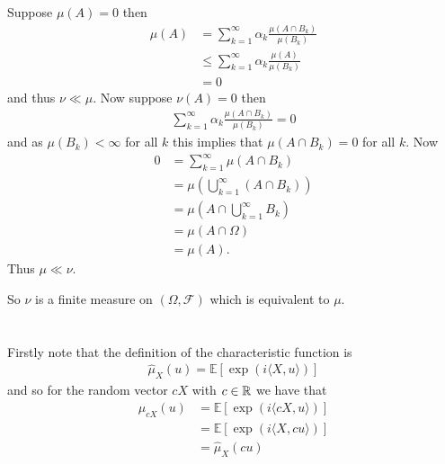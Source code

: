 \documentclass{unswmaths}
\begin{document}
Suppose $ \mu(A) = 0 $ then
\begin{align}
	\mu(A) &= \sum_{k=1}^\infty \alpha_k \frac{\mu(A \cap B_k)}{\mu(B_k)} \\
		&\leq \sum_{k=1}^\infty \alpha_k \frac{\mu(A)}{\mu(B_k)} \\
		&= 0
\end{align}
and thus $ \nu \ll \mu $.
Now suppose $ \nu(A) =0 $ then
\begin{align}
	\sum_{k=1}^\infty \alpha_k \frac{\mu(A \cap B_k)}{\mu(B_k)} = 0
\end{align}
and as $ \mu(B_k) < \infty $ for all $ k $ this implies that $ \mu(A \cap B_k ) = 0$ for all $ k $. Now
\begin{align}
	0 &= \sum_{k=1}^\infty \mu(A \cap B_k) \\
		&= \mu\left( \bigcup_{k=1}^\infty (A \cap B_k) \right) \\
		&= \mu\left( A \cap \bigcup_{k=1}^\infty B_k\right) \\
		&= \mu(A \cap \Omega) \\
		&= \mu(A).
\end{align}
Thus $ \mu \ll \nu $.

So $ \nu $ is a finite measure on $ (\Omega, \mathcal{F}) $ which is equivalent to $ \mu $.
\section{}
\subsection{}
Firstly note that the definition of the characteristic function is
\begin{align}
	\hat{\mu}_X(u) = \mathbb{E}[\exp(i\langle X, u \rangle)]
\end{align}
and so for the random vector $ cX $ with $ c \in \mathbb{R} $ we have that
\begin{align}
	\hat{\mu}_{cX}(u) &= \mathbb{E}[ \exp(i \langle cX, u \rangle) ] \\
		 &= \mathbb{E}[ \exp(i \langle X, cu \rangle) ] \\
		 &= \hat{\mu}_{X}(cu)
\end{align}
\end{document}
